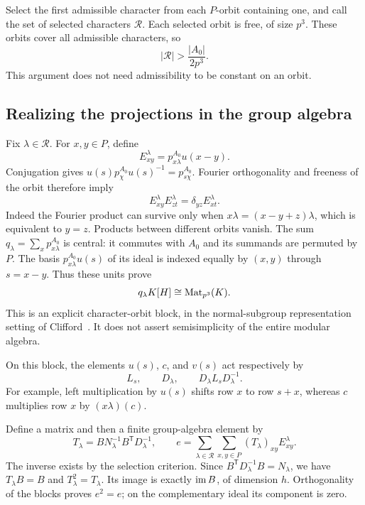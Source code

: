 Select the first admissible character from each $P$-orbit containing one,
and call the set of selected characters $\mathscr R$. Each selected
orbit is free, of size $p^3$. These orbits cover all admissible characters,
so
\begin{equation}\label{op:orbit-count}
 |\mathscr R|>\frac{|A_0|}{2p^3}.
\end{equation}
This argument does not need admissibility to be constant on an orbit.

\subsection{Realizing the projections in the group algebra}

Fix $\lambda\in\mathscr R$. For $x,y\in P$, define
\[
 E_{xy}^{\lambda}=p_{x\lambda}^{A_0}u(x-y).
\]
Conjugation gives $u(s)p_\chi^{A_0}u(s)^{-1}=p_{s\chi}^{A_0}$.
Fourier orthogonality and freeness of the orbit therefore imply
\[
 E_{xy}^{\lambda}E_{zt}^{\lambda}=\delta_{yz}E_{xt}^{\lambda}.
\]
Indeed the Fourier product can survive only when
$x\lambda=(x-y+z)\lambda$, which is equivalent to $y=z$.
Products between different orbits vanish. The sum
$q_\lambda=\sum_x p_{x\lambda}^{A_0}$ is central: it commutes with
$A_0$ and its summands are permuted by $P$. The basis
$p_{x\lambda}^{A_0}u(s)$ of its ideal is indexed equally by $(x,y)$
through $s=x-y$. Thus these units prove
\[
 q_\lambda K[H]\cong\operatorname{Mat}_{p^3}(K).
\]
This is an explicit character-orbit block, in the normal-subgroup
representation setting of Clifford~\cite{Clifford1937Announcement}.
It does not assert semisimplicity of the entire modular algebra.

On this block, the elements $u(s)$, $c$, and $v(s)$ act respectively by
\[
 L_s,\qquad D_\lambda,\qquad D_\lambda L_sD_\lambda^{-1}.
\]
For example, left multiplication by $u(s)$ shifts row $x$ to row $s+x$,
whereas $c$ multiplies row $x$ by $(x\lambda)(c)$.

Define a matrix and then a finite group-algebra element by
\begin{equation}\label{op:explicit-e}
 T_\lambda=BN_\lambda^{-1}B^{\mathsf T}D_\lambda^{-1},\qquad
 e=\sum_{\lambda\in\mathscr R}\sum_{x,y\in P}
       (T_\lambda)_{xy}E_{xy}^{\lambda}.
\end{equation}
The inverse exists by the selection criterion. Since
$B^{\mathsf T}D_\lambda^{-1}B=N_\lambda$, we have $T_\lambda B=B$
and $T_\lambda^2=T_\lambda$. Its image is exactly $\operatorname{im} B$, of dimension
$h$. Orthogonality of the blocks proves $e^2=e$; on the complementary
ideal its component is zero.

